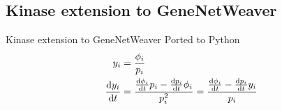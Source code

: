 \subsection{Kinase extension to GeneNetWeaver}
\begin{frame}{Kinase extension to GeneNetWeaver}
\label{sec:gnw_extension}
Ported to Python
\begin{subequations}
\label{eq:gnw_kinase}
\begin{align}
\label{eq:y_i}
y_i &= \frac{\phi_i}{p_i}
\\
\label{eq:dydt}
\dv{y_i}{t} &= \frac{\dv{\phi_i}{t} p_i - \dv{p_i}{t} \phi_i}{p_i^2} = \frac{\dv{\phi_i}{t} - \dv{p_i}{t} y_i}{p_i}
\end{align}
\end{subequations}

\end{frame}
